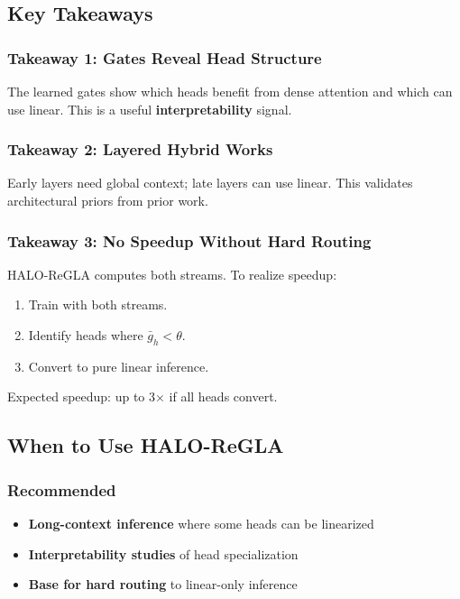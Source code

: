 \subsection{Key Takeaways}

\subsubsection{Takeaway 1: Gates Reveal Head Structure}

The learned gates show which heads benefit from dense attention and which 
can use linear. This is a useful \textbf{interpretability} signal.

\subsubsection{Takeaway 2: Layered Hybrid Works}

Early layers need global context; late layers can use linear. This 
validates architectural priors from prior work.

\subsubsection{Takeaway 3: No Speedup Without Hard Routing}

HALO-ReGLA computes both streams. To realize speedup:
\begin{enumerate}
\item Train with both streams.
\item Identify heads where $\bar{g}_h < \theta$.
\item Convert to pure linear inference.

\end{enumerate}
Expected speedup: up to 3$\times$ if all heads convert.

\subsection{When to Use HALO-ReGLA}

\subsubsection{Recommended}

\begin{itemize}
\item \textbf{Long-context inference} where some heads can be linearized
\item \textbf{Interpretability studies} of head specialization
\item \textbf{Base for hard routing} to linear-only inference

\end{itemize}
